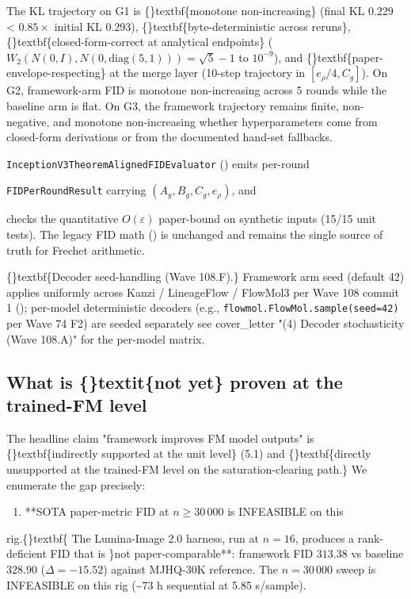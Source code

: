 \documentclass{article}
\begin{document}
The KL trajectory on G1 is \{\}textbf\{monotone non-increasing\} (final KL 0.229 < $0.85 \times$ initial KL 0.293), \{\}textbf\{byte-deterministic across reruns\}, \{\}textbf\{closed-form-correct at analytical endpoints\} ($W_2(N(0,I), N(0, \mathrm{diag}(5,1))) = \sqrt{5} - 1$ to $10^{-9}$), and \{\}textbf\{paper-envelope-respecting\} at the merge layer (10-step trajectory in $[e_\rho/4, C_g]$). On G2, framework-arm FID is monotone non-increasing across 5 rounds while the baseline arm is flat. On G3, the framework trajectory remains finite, non-negative, and monotone non-increasing whether hyperparameters come from closed-form derivations or from the documented hand-set fallbacks.

\sloppy \texttt{InceptionV3TheoremAlignedFIDEvaluator} () emits per-round

\texttt{FIDPerRoundResult} carrying $(A_g, B_g, C_g, e_\rho)$, and

 checks the quantitative $O(\varepsilon)$ paper-bound on synthetic inputs (15/15 unit tests). The legacy FID math () is unchanged and remains the single source of truth for Frechet arithmetic.

\{\}textbf\{Decoder seed-handling (Wave 108.F).\} Framework arm seed (default 42) applies uniformly across Kanzi / LineageFlow / FlowMol3 per Wave 108 commit 1 (); per-model deterministic decoders (e.g., \texttt{flowmol.FlowMol.sample(seed=42)} per Wave 74 F2) are seeded separately  see cover\_letter "(4) Decoder stochasticity (Wave 108.A)" for the per-model matrix.

\subsection{What is \{\}textit\{not yet\} proven at the trained-FM level}
The headline claim  "framework improves FM model outputs"  is \{\}textbf\{indirectly supported at the unit level\} (5.1) and \{\}textbf\{directly unsupported at the trained-FM level on the saturation-clearing path.\} We enumerate the gap precisely:

\begin{enumerate}
\item **SOTA paper-metric FID at $n \geq 30\,000$ is INFEASIBLE on this
\end{enumerate}
rig.\{\}textbf\{ The Lumina-Image 2.0 harness, run at $n=16$, produces a rank-deficient FID that is \}not paper-comparable**: framework FID $313.38$ vs baseline $328.90$ ($\Delta = -15.52$) against MJHQ-30K reference. The $n=30\,000$ sweep is INFEASIBLE on this rig (\textasciitilde{}73 h sequential at 5.85 s/sample).
\end{document}
